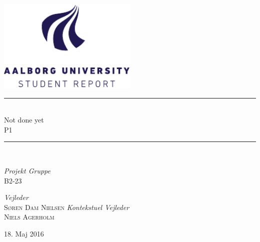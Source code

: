 %
%
%
%
%
\begin{titlepage}
	\begin{center}
		\newcommand{\HRule}{\rule{\linewidth}{0.5mm}}

		\includegraphics[width=0.5\textwidth]{figures/aau_logo_en.pdf}~\\[1cm]



		\HRule \\[0.4cm]
		{ \huge Not done yet\\[0.4cm]
			\large \textsc{P1}}

		\HRule \\[1.5cm]

		\begin{minipage}{0.4\textwidth}
			\begin{flushleft} \large
				\emph{Projekt Gruppe}\\
				\textsc{B2-23}
			\end{flushleft}
		\end{minipage}
		\begin{minipage}{0.4\textwidth}
			\begin{flushright} \large
				\emph{Vejleder} \\
				\textsc{Søren Dam Nielsen}
				\emph{Kontekstuel Vejleder} \\
				\textsc{Niels Agerholm}
			\end{flushright}
		\end{minipage}

		\vfill

		{\large 18. Maj 2016}

	\end{center}
\end{titlepage}

\clearpage
